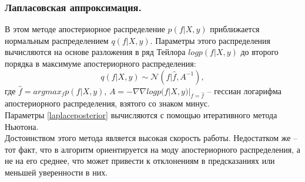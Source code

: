 \documentclass{llncs}
\begin{document}
\subsubsection{Лапласовская аппроксимация.}
В этом методе апостериорное распределение $p(f|X,y)$ приближается нормальным распределением $q(f|X,y)$. Параметры этого распределения вычисляются на основе разложения в ряд Тейлора $logp(f|X,y)$ до второго порядка в максимуме апостериорного распределения:
\begin{equation}\label{laplaceposterior}
q(f|X,y) \sim  \mathcal{N}(f|\hat{f}, A^{-1}),
\end{equation}
где $\hat{f} = argmax_{f} p(f|X,y)$, 
	$A = - \nabla \nabla logp(f|X,y)|_{f=\hat{f}}$ -- гессиан логарифма апостериорного распределения, взятого со знаком минус.\\
Параметры \eqref{laplaceposterior} вычисляются с помощью итеративного метода Ньютона.\\
Достоинством этого метода является высокая скорость работы. Недостатком же -- тот факт, что в алгоритм ориентируется на моду апостериорного распределения, а не на его среднее, что может привести к отклонениям в предсказаниях или меньшей уверенности в них.
\end{document}
